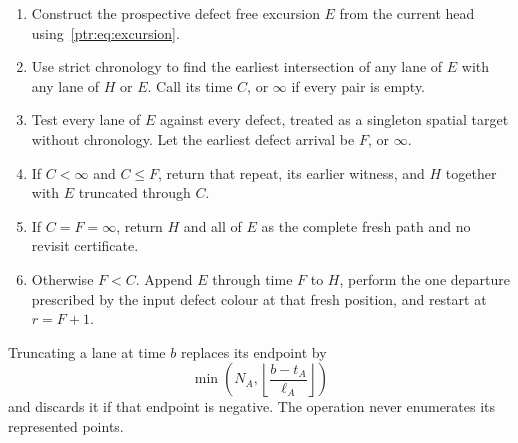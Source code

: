 \documentclass[11pt,letterpaper]{article}
\theoremstyle{definition}\newtheorem{definition}[theorem]{Definition}
\theoremstyle{remark}\newtheorem{remark}[theorem]{Remark}
\begin{document}
\begin{enumerate}
\item Construct the prospective defect free excursion $E$ from the current head using~\eqref{ptr:eq:excursion}.
\item Use strict chronology to find the earliest intersection of any lane of $E$ with any lane of $H$ or $E$. Call its time $C$, or $\infty$ if every pair is empty.
\item Test every lane of $E$ against every defect, treated as a singleton spatial target without chronology. Let the earliest defect arrival be $F$, or $\infty$.
\item If $C<\infty$ and $C\le F$, return that repeat, its earlier witness, and $H$ together with $E$ truncated through $C$.
\item If $C=F=\infty$, return $H$ and all of $E$ as the complete fresh path and no revisit certificate.
\item Otherwise $F<C$. Append $E$ through time $F$ to $H$, perform the one departure prescribed by the input defect colour at that fresh position, and restart at $r=F+1$.
\end{enumerate}
Truncating a lane at time $b$ replaces its endpoint by
\[
 \min\left(N_A,\left\lfloor\frac{b-t_A}{\ell_A}\right\rfloor\right)
\]
and discards it if that endpoint is negative. The operation never enumerates its represented points.
\end{document}
